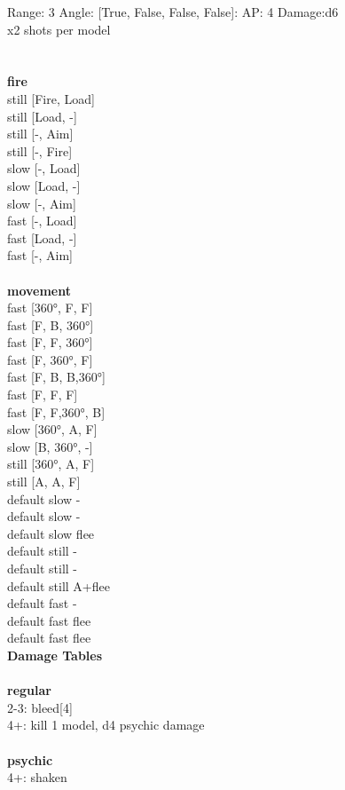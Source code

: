 Range: 3  Angle: [True, False, False, False]: AP: 4 Damage:d6 \\
x2 shots per model\\ 




 
\ \\



\ \\ {\bf fire } \\
still [Fire, Load] \\
still [Load, -] \\
still [-, Aim] \\
still [-, Fire] \\
slow [-, Load] \\
slow [Load, -] \\
slow [-, Aim] \\
fast [-, Load] \\
fast [Load, -] \\
fast [-, Aim] \\
\ \\ {\bf movement } \\
fast [360°, F, F] \\
fast [F, B, 360°] \\
fast [F, F, 360°] \\
fast [F, 360°, F] \\
fast [F, B, B,360°] \\
fast [F, F, F] \\
fast [F, F,360°, B] \\
slow [360°, A, F] \\
slow [B, 360°, -] \\
still [360°, A, F] \\
still [A, A, F] \\
default slow - \\
default slow - \\
default slow flee \\
default still - \\
default still - \\
default still A+flee \\
default fast - \\
default fast flee \\
default fast flee \\


{\bf Damage Tables} \\
\ \\ {\bf regular } \\
2-3: bleed[4] \\
4+: kill 1 model, d4 psychic damage \\
\ \\ {\bf psychic } \\
4+: shaken \\











